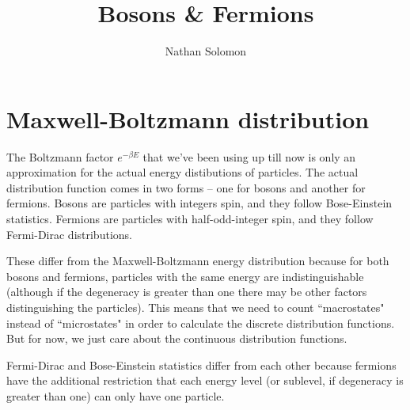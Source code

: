 \documentclass[12pt]{article}
\begin{document}
\title{Bosons \& Fermions}
\author{Nathan Solomon}
\maketitle

\section{Maxwell-Boltzmann distribution}
The Boltzmann factor $e^{-\beta E}$ that we've been using up till now is only an approximation for the actual energy distibutions of particles. The actual distribution function comes in two forms -- one for bosons and another for fermions. Bosons are particles with integers spin, and they follow Bose-Einstein statistics. Fermions are particles with half-odd-integer spin, and they follow Fermi-Dirac distributions.

These differ from the Maxwell-Boltzmann energy distribution because for both bosons and fermions, particles with the same energy are indistinguishable (although if the degeneracy is greater than one there may be other factors distinguishing the particles). This means that we need to count ``macrostates" instead of ``microstates" in order to calculate the discrete distribution functions. But for now, we just care about the continuous distribution functions.

Fermi-Dirac and Bose-Einstein statistics differ from each other because fermions have the additional restriction that each energy level (or sublevel, if degeneracy is greater than one) can only have one particle.
\end{document}
